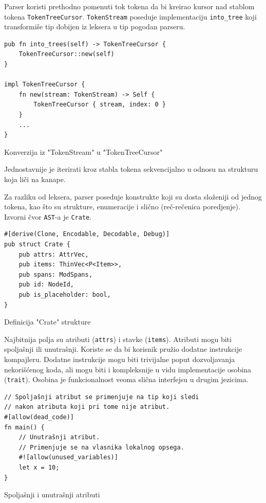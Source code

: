 \documentclass[11pt]{article}
\begin{document}
Parser koristi prethodno pomenuti tok tokena da bi kreirao kursor nad stablom tokena \verb|TokenTreeCursor|.
\verb|TokenStream| poseduje implementaciju \verb|into_tree| koji transformiše tip dobijen iz leksera
u tip pogodan parseru.

\begin{listing}[H]
\begin{verbatim}
pub fn into_trees(self) -> TokenTreeCursor {
    TokenTreeCursor::new(self)
}

impl TokenTreeCursor {
    fn new(stream: TokenStream) -> Self {
        TokenTreeCursor { stream, index: 0 }
    }
    ...
}
\end{verbatim}
\caption{Konverzija iz "TokenStream" u "TokenTreeCursor"}
\end{listing}
Jednostavnije je iterirati kroz stabla tokena sekvencijalno u odnosu na strukturu koja liči na kanape.

Za razliku od leksera, parser poseduje konstrukte koji su dosta složeniji od jednog tokena, kao što su 
strukture, enumeracije i slično (reč-rečenica poredjenje). Izvorni čvor \verb|AST|-a je \verb|Crate|.

\begin{listing}[H]
\begin{verbatim}
#[derive(Clone, Encodable, Decodable, Debug)]
pub struct Crate {
    pub attrs: AttrVec,
    pub items: ThinVec<P<Item>>,
    pub spans: ModSpans,
    pub id: NodeId,
    pub is_placeholder: bool,
}
\end{verbatim}
\caption{Definicija "Crate" strukture}
\end{listing}

\newpage

Najbitnija polja su atributi (\verb|attrs|) i stavke (\verb|items|). Atributi mogu biti spoljašnji ili unutrašnji.
Koriste se da bi korisnik pružio dodatne instrukcije kompajleru. 
Dodatne instrukcije mogu biti trivijalne poput dozvoljavanja
nekorišćenog koda, ali mogu biti i kompleksnije u vidu implementacije osobina 
(\verb|trait|). Osobina je funkcionalnost veoma slična interfejsu u drugim jezicima. 


\begin{listing}[H]
\begin{verbatim}
// Spoljašnji atribut se primenjuje na tip koji sledi 
// nakon atributa koji pri tome nije atribut.
#[allow(dead_code)] 
fn main() {
    // Unutrašnji atribut.
    // Primenjuje se na vlasnika lokalnog opsega. 
    #![allow(unused_variables)]
    let x = 10;  
}
\end{verbatim}
\caption{Spoljašnji i unutrašnji atributi}
\end{listing}
\end{document}
